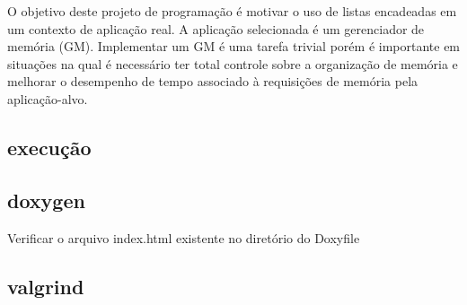 O objetivo deste projeto de programação é motivar o uso de listas encadeadas em um contexto de aplicação real. A aplicação selecionada é um gerenciador de memória (G\-M). Implementar um G\-M é uma tarefa trivial porém é importante em situações na qual é necessário ter total controle sobre a organização de memória e melhorar o desempenho de tempo associado à requisições de memória pela aplicação-\/alvo.

\subsection*{execução}

\subsection*{doxygen}

Verificar o arquivo index.\-html existente no diretório do Doxyfile

\subsection*{valgrind}